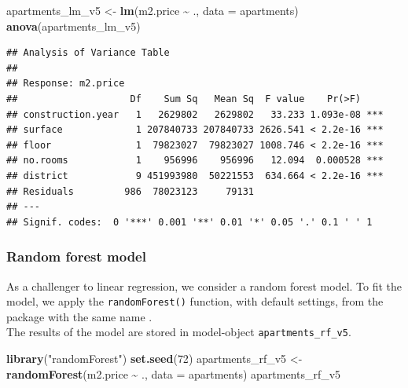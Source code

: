 \documentclass[12pt,]{krantz}
\newenvironment{Shaded}{\begin{snugshade}}{\end{snugshade}}
\newcommand{\DataTypeTok}[1]{\textcolor[rgb]{0.13,0.29,0.53}{#1}}
\newcommand{\DecValTok}[1]{\textcolor[rgb]{0.00,0.00,0.81}{#1}}
\newcommand{\KeywordTok}[1]{\textcolor[rgb]{0.13,0.29,0.53}{\textbf{#1}}}
\newcommand{\NormalTok}[1]{#1}
\newcommand{\OperatorTok}[1]{\textcolor[rgb]{0.81,0.36,0.00}{\textbf{#1}}}
\newcommand{\StringTok}[1]{\textcolor[rgb]{0.31,0.60,0.02}{#1}}
\begin{document}
\begin{Shaded}
\begin{Highlighting}[]
\NormalTok{apartments\_lm\_v5 \textless{}{-}}\StringTok{ }\KeywordTok{lm}\NormalTok{(m2.price }\OperatorTok{\textasciitilde{}}\StringTok{ }\NormalTok{., }\DataTypeTok{data =}\NormalTok{ apartments)}
\KeywordTok{anova}\NormalTok{(apartments\_lm\_v5)}
\end{Highlighting}
\end{Shaded}

\begin{verbatim}
## Analysis of Variance Table
## 
## Response: m2.price
##                    Df    Sum Sq   Mean Sq  F value    Pr(>F)    
## construction.year   1   2629802   2629802   33.233 1.093e-08 ***
## surface             1 207840733 207840733 2626.541 < 2.2e-16 ***
## floor               1  79823027  79823027 1008.746 < 2.2e-16 ***
## no.rooms            1    956996    956996   12.094  0.000528 ***
## district            9 451993980  50221553  634.664 < 2.2e-16 ***
## Residuals         986  78023123     79131                       
## ---
## Signif. codes:  0 '***' 0.001 '**' 0.01 '*' 0.05 '.' 0.1 ' ' 1
\end{verbatim}

\hypertarget{model-Apartments-rf}{%
\subsubsection{Random forest model}\label{model-Apartments-rf}}

As a challenger to linear regression, we consider a random forest model. To fit the model, we apply the \texttt{randomForest()} function, with default settings, from the package with the same name \citep{randomForest}.\\
The results of the model are stored in model-object \texttt{apartments\_rf\_v5}.

\begin{Shaded}
\begin{Highlighting}[]
\KeywordTok{library}\NormalTok{(}\StringTok{"randomForest"}\NormalTok{)}
\KeywordTok{set.seed}\NormalTok{(}\DecValTok{72}\NormalTok{)}
\NormalTok{apartments\_rf\_v5 \textless{}{-}}\StringTok{ }\KeywordTok{randomForest}\NormalTok{(m2.price }\OperatorTok{\textasciitilde{}}\StringTok{ }\NormalTok{., }\DataTypeTok{data =}\NormalTok{ apartments)}
\NormalTok{apartments\_rf\_v5}
\end{Highlighting}
\end{Shaded}
\end{document}
